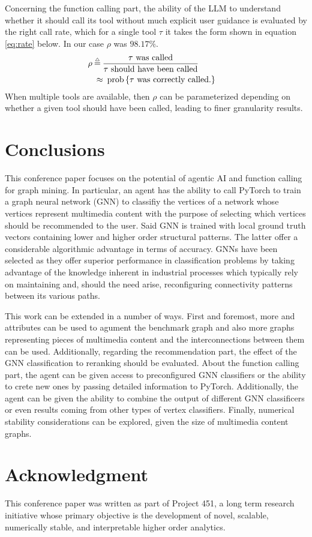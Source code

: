 \documentclass[conference, compsoc, final]{IEEEtran}
\DeclareMathOperator{\bmopprob}{prob}
\newcommand{\bmdef}{{\buildrel{{\mathsmaller{\triangle}}}\over{=}}}
\newcommand{\bmprob}[1]{\bmopprob\left\lbrace{#1}\right\rbrace}
\def\bmwork{conference paper}
\def\bmworkw{work}
\begin{document}
Concerning the function calling part, the ability of the LLM to understand whether it should call its tool without much explicit user guidance is evaluated by the right call rate, which for a single tool $\tau$ it takes the form shown in equation \eqref{eq:rate} below. In our case $\rho$ was $98.17\%$.
\begin{align}
\rho  &  \:\bmdef\:
\dfrac{\tau~\textrm{was called}}{\tau~\textrm{should have been called}}  \cr  
    &  \:\approx\: \bmprob{\tau~\textrm{was correctly called.}}
\label{eq:rate}
\end{align}
When multiple tools are available, then $\rho$ can be parameterized depending on whether a given tool should have been called, leading to finer granularity results.


\section{Conclusions}\label{sec:more}


This \bmwork{} focuses on the potential of agentic AI and function calling for graph mining. In particular, an agent has the ability to call PyTorch to train a graph neural network (GNN) to classifiy the vertices of a network whose vertices represent multimedia content with the purpose of selecting which vertices should be recommended to the user. Said GNN is trained with local ground truth vectors containing lower and higher order structural patterns. The latter offer a considerable algorithmic advantage in terms of accuracy. GNNs have been selected as they offer superior performance in classification problems by taking advantage of the knowledge inherent in industrial processes which typically rely on maintaining and, should the need arise, reconfiguring connectivity patterns between its various paths.

This \bmworkw{} can be extended in a number of ways. First and foremost, more and attributes can be used to agument the benchmark graph and also more graphs representing pieces of multimedia content and the interconnections between them can be used. Additionally, regarding the recommendation part, the effect of the GNN classification to reranking should be evaluated. About the function calling part, the agent can be given access to preconfigured GNN classifiers or the ability to crete new ones by passing detailed information to PyTorch. Additionally, the agent can be given the ability to combine the output of different GNN classificers or even results coming from other types of vertex classifiers. Finally, numerical stability considerations can be explored, given the size of multimedia content graphs.


\section*{Acknowledgment}


This \bmwork{} was written as part of Project 451, a long term research initiative whose primary objective is the development of novel, scalable, numerically stable, and interpretable higher order analytics.




\end{document}
